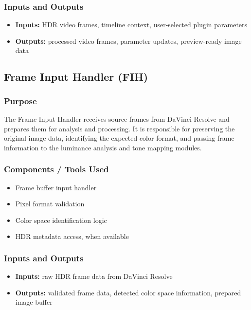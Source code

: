 \documentclass{article}
\begin{document}
\subsubsection*{Inputs and Outputs}
\begin{itemize}
    \item \textbf{Inputs:} HDR video frames, timeline context, user-selected plugin parameters
    \item \textbf{Outputs:} processed video frames, parameter updates, preview-ready image data
\end{itemize}


\subsection{Frame Input Handler (FIH)}

\subsubsection*{Purpose}
The Frame Input Handler receives source frames from DaVinci Resolve and prepares them for analysis and processing. It is responsible for preserving the original image data, identifying the expected color format, and passing frame information to the luminance analysis and tone mapping modules.

\subsubsection*{Components / Tools Used}
\begin{itemize}
    \item Frame buffer input handler
    \item Pixel format validation
    \item Color space identification logic
    \item HDR metadata access, when available
\end{itemize}

\subsubsection*{Inputs and Outputs}
\begin{itemize}
    \item \textbf{Inputs:} raw HDR frame data from DaVinci Resolve
    \item \textbf{Outputs:} validated frame data, detected color space information, prepared image buffer
\end{itemize}
\end{document}
